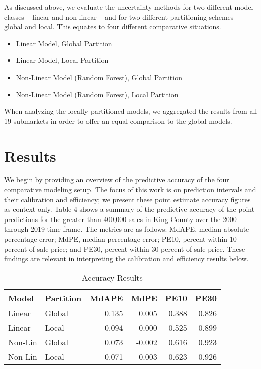 \documentclass[colTwo]{anon}
\theoremstyle{definition}
\begin{document}
As discussed above, we evaluate the uncertainty methods for two different model classes -- linear and non-linear -- and for two different partitioning schemes -- global and local.  This equates to four different comparative situations.

\begin{itemize}
\item Linear Model, Global Partition
\item Linear Model, Local Partition
\item Non-Linear Model (Random Forest), Global Partition
\item Non-Linear Model (Random Forest), Local Partition
\end{itemize}

When analyzing the locally partitioned models, we aggregated the results from all 19 submarkets in order to offer an equal comparison to the global models.

\section{Results}

We begin by providing an overview of the predictive accuracy of the four comparative modeling setup. The focus of this work is on prediction intervals and their calibration and efficiency; we present these point estimate accuracy figures as context only. Table 4 shows a summary of the predictive accuracy of the point predictions for the greater than 400,000 sales in King County over the 2000 through 2019 time frame. The metrics are as follows: MdAPE, median absolute percentage error; MdPE, median percentage error; PE10, percent within 10 percent of sale price; and PE30, percent within 30 percent of sale price. These findings are relevant in interpreting the calibration and efficiency results below.

\begin{table}[h!]
\centering
\footnotesize
\begin{tabular}{l|l|r|r|r|r}
\hline
\textbf{Model} & \textbf{Partition} & \textbf{MdAPE} & \textbf{MdPE} & \textbf{PE10} & \textbf{PE30}\\
\hline
Linear & Global & 0.135 & 0.005 & 0.388 & 0.826\\
Linear & Local & 0.094 & 0.000 & 0.525 & 0.899\\
\hline
Non-Lin & Global & 0.073 & -0.002 & 0.616 & 0.923\\
Non-Lin & Local & 0.071 & -0.003 & 0.623 & 0.926\\
\hline
\end{tabular}
\caption{Accuracy Results}
\label{table:4}
\end{table}
\end{document}
